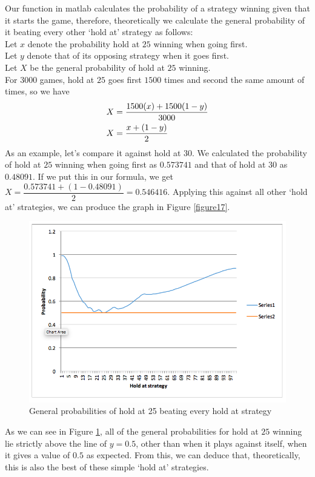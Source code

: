 \documentclass[a4paper,titlepage]{article}
\begin{document}
Our function in matlab calculates the probability of a strategy winning given that it starts the game, therefore, theoretically we calculate the general probability of it beating every other ‘hold at’ strategy as follows:\\Let $x$ denote the probability hold at $25$ winning when going first.\\Let $y$ denote that of its opposing strategy when it goes first.\\Let $X$ be the general probability of hold at $25$ winning.\\For $3000$ games, hold at $25$ goes first $1500$ times and second the same amount of times, so we have
\begin{align}
X &= \dfrac{1500(x)+1500(1-y)}{3000}\notag\\
X &= \dfrac{x+(1-y)}{2}\notag
\end{align}
As an example, let’s compare it against hold at $30$. We calculated the probability of hold at $25$ winning when going first as $0.573741$ and that of hold at $30$ as $0.48091$. If we put this in our formula, we get\\ $X=\dfrac{0.573741+(1-0.48091)}{2}=0.546416$. Applying this against all other ‘hold at’ strategies, we can produce the graph in Figure \ref{figure17}.
\begin{figure}
\centering
\includegraphics[width=\textwidth]{stats_3}
\caption{General probabilities of hold at 25 beating every hold at strategy\label{figure18}}
\end{figure}
As we can see in Figure \ref{figure18}, all of the general probabilities for hold at $25$ winning lie strictly above the line of $y=0.5$, other than when it plays against itself, when it gives a value of $0.5$ as expected. From this, we can deduce that, theoretically, this is also the best of these simple ‘hold at’ strategies.
\end{document}
